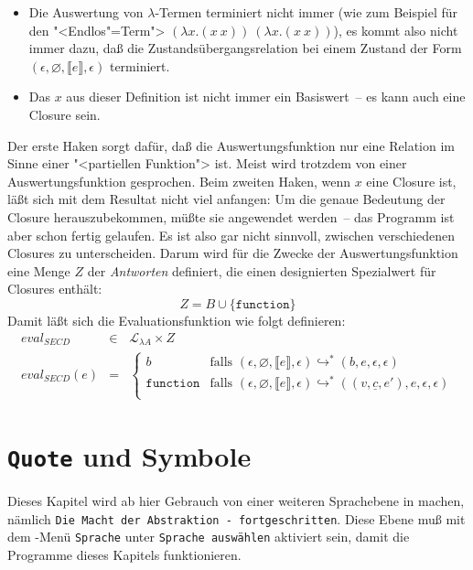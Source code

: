 %
\begin{itemize}
\item Die Auswertung von $\lambda$-Termen terminiert nicht immer (wie
  zum Beispiel für den "<Endlos"=Term"> $(\lambda x.(x~x))~(\lambda x.(x~x))$), es kommt
  also nicht immer dazu, daß die Zustandsübergangsrelation bei einem
  Zustand der Form $(\epsilon, \varnothing, \llbracket e\rrbracket,
  \epsilon)$ terminiert.
\item Das $x$ aus dieser Definition ist nicht immer ein Basiswert~--
  es kann auch eine Closure sein.
\end{itemize}
%
Der erste Haken sorgt dafür, daß die Auswertungsfunktion nur eine
Relation im Sinne einer "<partiellen Funktion"> ist.  Meist wird
trotzdem von einer Auswertungsfunktion gesprochen.  Beim zweiten
Haken, wenn $x$ eine Closure ist, läßt sich mit dem Resultat nicht
viel anfangen: Um die genaue Bedeutung der Closure herauszubekommen,
müßte sie angewendet werden~-- das Programm ist aber schon fertig
gelaufen.  Es ist also gar nicht sinnvoll, zwischen verschiedenen
Closures zu unterscheiden.  Darum wird für die Zwecke der
Auswertungsfunktion eine Menge $Z$ der \textit{Antworten}
definiert, die einen designierten Spezialwert für Closures enthält:
%
\begin{displaymath}
  Z = B \cup \{ \texttt{function} \}
\end{displaymath}
%
Damit läßt sich die Evaluationsfunktion wie folgt definieren:
%
\begin{eqnarray*}
  \mathit{eval}_\mathit{SECD} & \in & \mathcal{L}_{\lambda{}A} \times Z\\
  \mathit{eval}_\mathit{SECD}(e) & = &
  \begin{cases}
    b & \textrm{falls } (\epsilon, \varnothing, \llbracket e\rrbracket, \epsilon)
    \hookrightarrow^* (b, e, \epsilon, \epsilon)\\
    \texttt{function} & \textrm{falls } (\epsilon, \varnothing, \llbracket e\rrbracket, \epsilon)
    \hookrightarrow^* ((v, \underline{c}, e'), e, \epsilon, \epsilon)\\
  \end{cases}
\end{eqnarray*}

\section{\texttt{Quote} und Symbole}
\label{sec:quote}

Dieses Kapitel wird ab hier Gebrauch von einer weiteren
Sprachebene in
\drscheme{} machen, nämlich \texttt{Die Macht der Abstraktion -
  fortgeschritten}.  Diese Ebene muß mit dem \drscheme{}-Menü \texttt{Sprache}
unter \texttt{Sprache auswählen} aktiviert sein, damit die
Programme dieses Kapitels funktionieren.

